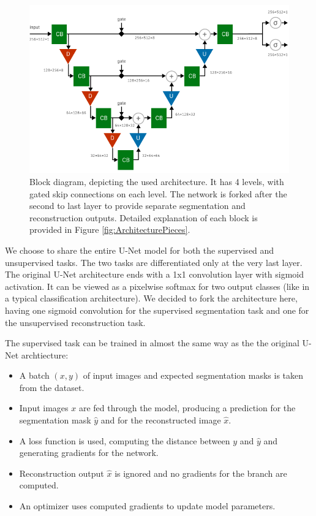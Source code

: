 \begin{figure}[ht]
    \centering
    \includegraphics[width=145mm]{../img/architecture-complete.pdf}
    \caption{Block diagram, depicting the used architecture. It has 4 levels, with gated skip connections on each level. The network is forked after the second to last layer to provide separate segmentation and reconstruction outputs. Detailed explanation of each block is provided in Figure \ref{fig:ArchitecturePieces}.}
    \label{fig:ArchitectureCombined}
\end{figure}

We choose to share the entire U-Net model for both the supervised and unsupervised tasks. The two tasks are differentiated only at the very last layer. The original U-Net architecture ends with a 1x1 convolution layer with sigmoid activation. It can be viewed as a pixelwise softmax for two output classes (like in a typical classification architecture). We decided to fork the architecture here, having one sigmoid convolution for the supervised segmentation task and one for the unsupervised reconstruction task.

The supervised task can be trained in almost the same way as the the original U-Net archtiecture:

\begin{itemize}
    \item A batch $(x, y)$ of input images and expected segmentation masks is taken from the dataset.
    \item Input images $x$ are fed through the model, producing a prediction for the segmentation mask $\hat{y}$ and for the reconstructed image $\hat{x}$.
    \item A loss function is used, computing the distance between $y$ and $\hat{y}$ and generating gradients for the network.
    \item Reconstruction output $\hat{x}$ is ignored and no gradients for the branch are computed.
    \item An optimizer uses computed gradients to update model parameters.
\end{itemize}

